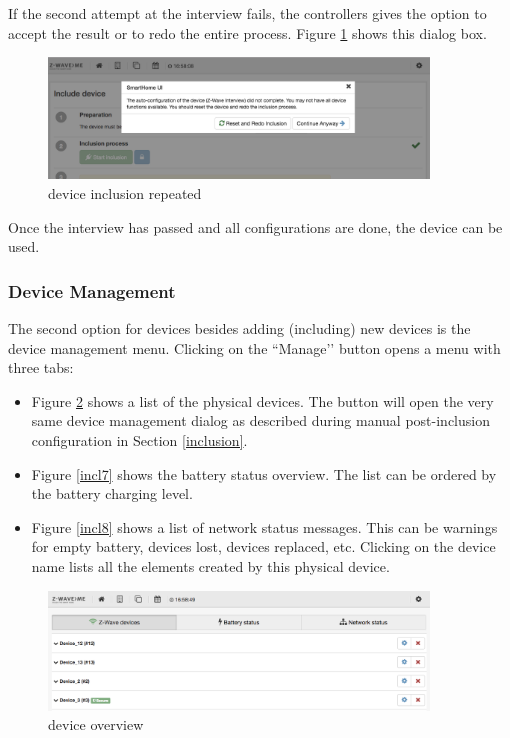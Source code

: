 If the second attempt at the interview fails, the controllers gives the option to 
accept the result or to redo the entire process. Figure \ref{incl5} shows this dialog box.

\begin{figure}
\begin{center}
\includegraphics[width=0.9\textwidth]{pngs/cap4/incl5.png}
\caption{\zwave device inclusion repeated}
\label{incl5}
\end{center}
\end{figure}

Once the interview has passed and all configurations are done, the device can be used.

\subsubsection{\zwave Device Management}

The second option for \zwave devices besides adding (including) new devices is the device 
management menu. Clicking on the ``Manage’’ button opens a menu with three tabs:

\begin{itemize}
\item Figure \ref{incl6} shows a list of the physical \zwave devices. The \keystroke{*} button 
will open the very same device management dialog as described during manual post-inclusion 
configuration in Section \ref{inclusion}.
\item Figure \ref{incl7} shows the battery status overview. The list can be ordered by 
the battery charging level.
\item Figure \ref{incl8} shows a list of network status messages. This can be warnings 
for empty battery, devices lost, devices replaced, etc. Clicking on the device name 
lists all the elements created by this physical device.
\end{itemize}


\begin{figure}
\begin{center}
\includegraphics[width=0.9\textwidth]{pngs/cap4/incl6.png}
\caption{\zwave device overview}
\label{incl6}
\end{center}
\end{figure}


